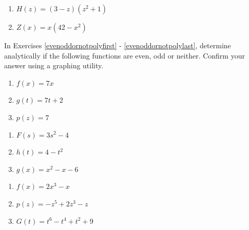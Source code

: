 \begin{multicols}{2}
\begin{enumerate}
\setcounter{enumi}{\value{HW}}

\item $H(z) = (3-z)(z^2+1)$
\item $Z(x) = x(42 - x^{2})$ \label{zeromultgraphlast}

\setcounter{HW}{\value{enumi}}
\end{enumerate}
\end{multicols}

In Exercises \ref{evenoddornotpolyfirst} - \ref{evenoddornotpolylast}, determine analytically if the following functions are even, odd or neither.  Confirm your answer using a graphing utility.


\begin{multicols}{3}
\begin{enumerate}
\setcounter{enumi}{\value{HW}}

\item $f(x) = 7x$ \label{evenoddornotpolyfirst}
\item $g(t) = 7t + 2$
\item $p(z) = 7$

\setcounter{HW}{\value{enumi}}
\end{enumerate}
\end{multicols}

\begin{multicols}{3}
\begin{enumerate}
\setcounter{enumi}{\value{HW}}

\item $F(s) = 3s^2 - 4$
\item $h(t) = 4-t^2$
\item $g(x) = x^2-x-6$

\setcounter{HW}{\value{enumi}}
\end{enumerate}
\end{multicols}


\begin{multicols}{3}
\begin{enumerate}
\setcounter{enumi}{\value{HW}}

\item $f(x) = 2x^3 - x$
\item $p(z) = -z^5 + 2z^3 - z$
\item $G(t) = t^{6} - t^{4} + t^{2} + 9$

\setcounter{HW}{\value{enumi}}
\end{enumerate}
\end{multicols}


